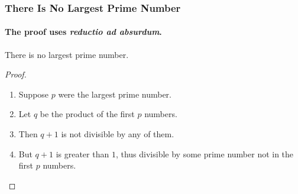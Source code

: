 \documentclass{beamer}
\begin{document}
\begin{frame}
    \frametitle{There Is No Largest Prime Number}
    \framesubtitle{The proof uses \textit{reductio ad absurdum}.}
    \begin{theorem}
        There is no largest prime number.
    \end{theorem}
    \begin{proof}
        \begin{enumerate}
            \item<1-> Suppose $p$ were the largest prime number.
            \item<2-> Let $q$ be the product of the first $p$ numbers.
            \item<3-> Then $q + 1$ is not divisible by any of them.
            \item<1-> But $q + 1$ is greater than $1$, thus divisible by some prime 
            number not in the first $p$ numbers.\qedhere
        \end{enumerate}
    \end{proof}
\end{frame}
\end{document}
